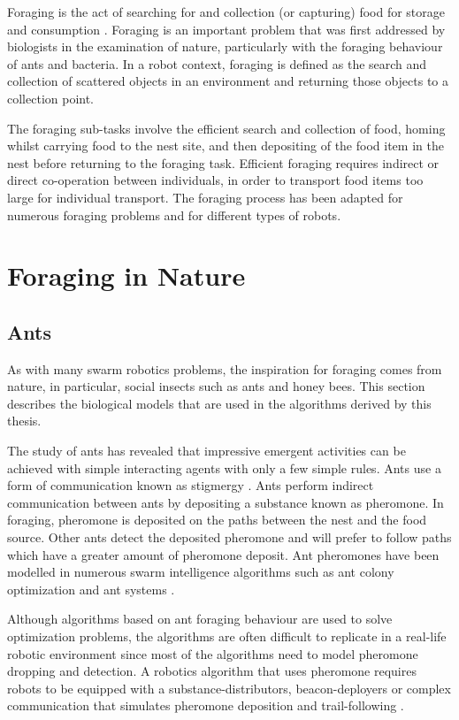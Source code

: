 Foraging is the act of searching for and collection (or capturing) food for storage and consumption \cite{winfield2009foraging}. Foraging is an important problem that was first addressed by biologists in the examination of nature, particularly with the foraging behaviour of ants and bacteria. In a robot context, foraging is defined as the search and collection of scattered objects in an environment and returning those objects to a collection point.

The foraging sub-tasks involve the efficient search and collection of food, homing whilst carrying food to the nest site, and then depositing of the food item in the nest before returning to the foraging task. Efficient foraging requires indirect or direct co-operation between individuals, in order to transport food items too large for individual transport. The foraging process has been adapted for numerous foraging problems and for different types of robots.


\section{Foraging in Nature}
\label{foraginginnature}


\subsection{Ants}
\label{sec:second:biological}
As with many swarm robotics problems, the inspiration for foraging comes from nature, in particular, social insects such as ants and honey bees. This section describes the biological models that are used in the algorithms derived by this thesis. 

The study of ants has revealed that impressive emergent activities can be achieved with simple interacting agents with only a few simple rules. Ants use a form of communication known as stigmergy \cite{dorigo2000ant}. Ants perform indirect communication between ants by depositing a substance known as pheromone. In foraging, pheromone is deposited on the paths between the nest and the food source. Other ants detect the deposited pheromone and will prefer to follow paths which have a greater amount of pheromone deposit. Ant pheromones have been modelled in numerous swarm intelligence algorithms such as ant colony optimization and ant systems \cite{dorigo2006ant, dorigo2010ant}. 
 
Although algorithms based on ant foraging behaviour are used to solve optimization problems, the algorithms are often difficult to replicate in a real-life robotic environment since most of the algorithms need to model pheromone dropping and detection. A robotics algorithm that uses pheromone requires robots to be equipped with a substance-distributors, beacon-deployers or complex communication that simulates pheromone deposition and trail-following \cite{hoff2010two}.

